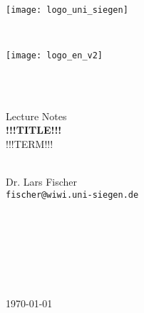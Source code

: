 \begin{titlepage}
  \begin{center}
    \vfill
    ~\hfill~
    \begin{minipage}{0.5\textwidth}
      \texttt{[image: logo\_uni\_siegen]}
    \end{minipage}
    ~\hfill~
    \begin{minipage}{0.25\textwidth}
      \texttt{[image: logo\_en\_v2]}
    \end{minipage}
    ~\hfill~
    
    \vfill
    \HRule\\[2ex]
    {\large Lecture Notes}\\[2ex]
    {\LARGE\bf !!!TITLE!!!}\\[1ex]
    {\normalsize !!!TERM!!!}\\[4ex]
    ~\hfill~
    \begin{minipage}{0.45\textwidth}
      \begin{center}
        Dr. Lars Fischer\\[0.5ex]
        {\tt\normalsize fischer@wiwi.uni-siegen.de}
      \end{center}
    \end{minipage}
    ~\hfill~\\[2ex]
    \HRule\\[4ex]
    \vfill
    \begin{minipage}{0.28\textwidth}
    \end{minipage}
    ~\hfill~
    \begin{minipage}{0.34\textwidth}
      \small
      \begin{algorithmic}
        \ENDFOR
        \ENDFOR
      \end{algorithmic}
    \end{minipage}
    ~\hfill~
    \begin{minipage}{0.28\textwidth}
    \end{minipage}
    \vfill
    {\normalsize\today}
  \end{center}
\end{titlepage}
\cleardoublepage
\renewcommand{\bibname}{References}

